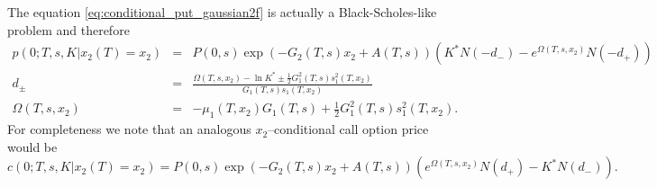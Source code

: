 \documentclass[11pt,a4paper]{article}
\numberwithin{equation}{section}
\begin{document}
The equation \eqref{eq:conditional_put_gaussian2f} is actually a Black-Scholes-like problem and therefore
\begin{eqnarray*}
p(0;T,s,K|{x_2}(T) = {x_2}) &=& P(0,s)\exp \left( { - {G_2}(T,s){x_2} + A(T,s)} \right)\left( {{K^*}N( - {d_ - }) - {e^{\Omega (T,s,{x_2})}}N( - {d_ + })} \right)\\
{d_ \pm } &=& \frac{{\Omega (T,s,{x_2}) - \ln {K^*} \pm \frac{1}{2}G_1^2(T,s)s_1^2(T,{x_2})}}{{{G_1}(T,s){s_1}(T,{x_2})}}\\
\Omega (T,s,{x_2}) &=&  - {\mu _1}(T,{x_2}){G_1}(T,s) + \frac{1}{2}G_1^2(T,s)s_1^2(T,{x_2}).
\end{eqnarray*}
For completeness we note that an analogous $x_2$--conditional call option price would be
\begin{equation*}
  c(0;T,s,K|{x_2}(T) = {x_2}) = P(0,s)\exp \left( { - {G_2}(T,s){x_2} + A(T,s)} \right)\left( {{e^{\Omega (T,s,{x_2})}}N({d_ + }) - {K^*}N({d_ - })} \right).
\end{equation*}



\newpage
\end{document}
